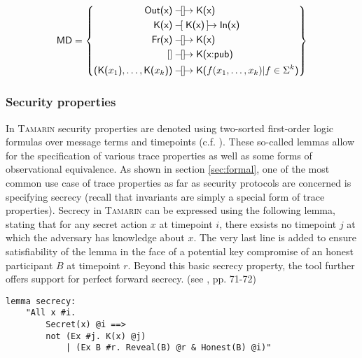 \begin{equation*}
    \textsf{MD} = \left\{
        \begin{aligned}
            \textsf{Out(x)} &\ltracerule\rtracerule \textsf{K(x)}\\
            \textsf{K(x)} &\tracerule{\textsf{K(x)}} \textsf{In(x)}\\
            \textsf{Fr(x)} &\ltracerule\rtracerule \textsf{K(x)}\\
            [] &\ltracerule\rtracerule \textsf{K(x:pub)}\\
            \textsf{(K(}x_1\textsf{)}, \ldots, \textsf{K(}x_k\textsf{))} &\ltracerule\rtracerule \textsf{K(}f(x_1, \ldots, x_k) | f \in \Sigma^k\textsf{)}
        \end{aligned}
    \right\}
\end{equation*}

\subsubsection{Security properties} 

In \textsc{Tamarin} security properties are denoted using two-sorted first-order logic formulas over message terms and timepoints (c.f. \cite{meier2013advancing}).
These so-called lemmas allow for the specification of various trace properties as well as some forms of observational equivalence.
As shown in section \ref{sec:formal}, one of the most common use case of trace properties as far as security protocols are concerned is specifying secrecy (recall that invariants are simply a special form of trace properties).
Secrecy in \textsc{Tamarin} can be expressed using the following lemma, stating that for any secret action $x$ at timepoint $i$, there exsists no timepoint $j$ at which the adversary has knowledge about $x$.
The very last line is added to ensure satisfiability of the lemma in the face of a potential key compromise of an honest participant $B$ at timepoint $r$.
Beyond this basic secrecy property, the tool further offers support for perfect forward secrecy. (see \cite{tamarin2019manual}, pp. 71-72)

\begin{lstlisting}
lemma secrecy:
    "All x #i.
        Secret(x) @i ==>
        not (Ex #j. K(x) @j)
            | (Ex B #r. Reveal(B) @r & Honest(B) @i)"
\end{lstlisting}

